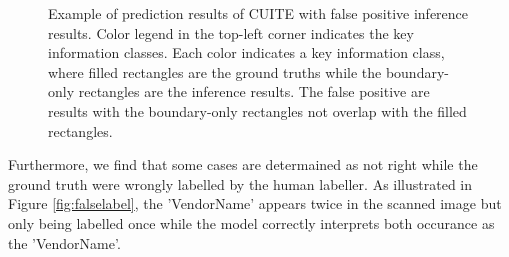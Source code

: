 \documentclass[10pt,twocolumn,letterpaper]{article}
\begin{document}
\begin{figure}
\begin{center}
\end{center}
   \caption{Example of prediction results of CUITE with false positive inference results. Color legend in the top-left corner indicates the key information classes. Each color indicates a key information class, where filled rectangles are the ground truths while the boundary-only rectangles are the inference results. The false positive are results with the boundary-only rectangles not overlap with the filled rectangles.}
\label{fig:falsepositive}
\end{figure}

Furthermore, we find that some cases are determained as not right while the ground truth were wrongly labelled by the human labeller. As illustrated in Figure \ref{fig:falselabel}, the 'VendorName' appears twice in the scanned image but only being labelled once while the model correctly interprets both occurance as the 'VendorName'.
\end{document}
